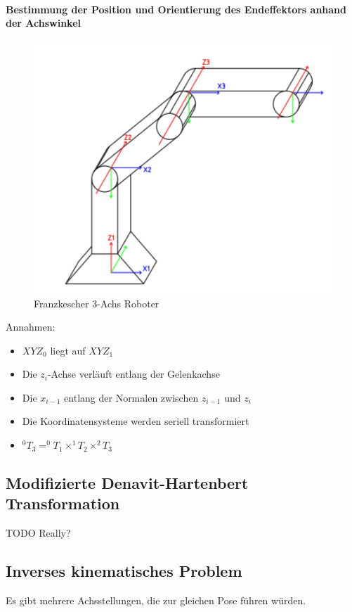 \paragraph{Bestimmung der Position und Orientierung des Endeffektors anhand der Achswinkel}
\begin{figure}[H]
	\begin{center}
		\includegraphics[]{resources/PNG/arm-endeffektor.PNG}
		\caption{Franzkescher 3-Achs Roboter}
		\label{fig:resources/PNG/arm-endeffektor.PNG}
	\end{center}
\end{figure}
Annahmen:
\begin{itemize}
	\item $XYZ_0$ liegt auf $XYZ_1$
	\item Die $z_i$-Achse verläuft entlang der Gelenkachse
	\item Die $x_{i-1}$ entlang der Normalen zwischen $z_{i-1}$ und $z_i$
	\item Die Koordinatensysteme werden seriell transformiert
	\item $^0T_3 = ^0T_1 \times ^1T_2 \times ^2T_3$
\end{itemize}
\subsection{Modifizierte Denavit-Hartenbert Transformation}
TODO Really?
\subsection{Inverses kinematisches Problem}
Es gibt mehrere Achsstellungen, die zur gleichen Pose führen würden.

